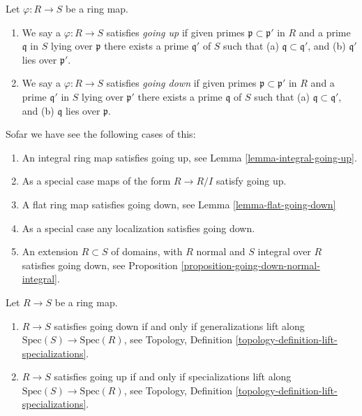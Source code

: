 \begin{definition}
\label{definition-going-up-down}
Let $\varphi : R \to S$ be a ring map.
\begin{enumerate}
\item We say a $\varphi : R \to S$ satisfies {\it going up} if
given primes $\mathfrak p \subset \mathfrak p'$ in $R$
and a prime $\mathfrak q$ in $S$ lying over $\mathfrak p$
there exists a prime $\mathfrak q'$ of $S$ such that
(a) $\mathfrak q \subset \mathfrak q'$, and (b)
$\mathfrak q'$ lies over $\mathfrak p'$.
\item We say a $\varphi : R \to S$ satisfies {\it going down} if
given primes $\mathfrak p \subset \mathfrak p'$ in $R$
and a prime $\mathfrak q'$ in $S$ lying over $\mathfrak p'$
there exists a prime $\mathfrak q$ of $S$ such that
(a) $\mathfrak q \subset \mathfrak q'$, and (b)
$\mathfrak q$ lies over $\mathfrak p$.
\end{enumerate}
\end{definition}

\noindent
Sofar we have see the following cases of this:
\begin{enumerate}
\item An integral ring map satisfies going up, see
Lemma \ref{lemma-integral-going-up}.
\item As a special case maps of the form $R \to R/I$ satisfy
going up.
\item A flat ring map satisfies going down, see
Lemma \ref{lemma-flat-going-down}
\item As a special case any localization satisfies going down.
\item An extension $R \subset S$ of domains, with $R$ normal
and $S$ integral over $R$ satisfies going down, see
Proposition \ref{proposition-going-down-normal-integral}.
\end{enumerate}

\begin{lemma}
\label{lemma-going-up-down-specialization}
Let $R \to S$ be a ring map.
\begin{enumerate}
\item $R \to S$ satisfies going down if and only if
generalizations lift along $\text{Spec}(S) \to \text{Spec}(R)$,
see Topology, Definition \ref{topology-definition-lift-specializations}.
\item $R \to S$ satisfies going up if and only if
specializations lift along $\text{Spec}(S) \to \text{Spec}(R)$,
see Topology, Definition \ref{topology-definition-lift-specializations}.
\end{enumerate}
\end{lemma}

